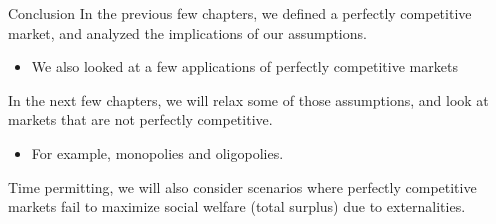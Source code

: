 \documentclass{beamer}
\begin{document}
\begin{frame}{Conclusion}
  In the previous few chapters, we defined a perfectly competitive market, and analyzed the implications of our assumptions.

  \begin{itemize}
    \item We also looked at a few applications of perfectly competitive markets
  \end{itemize}

  \medskip
  In the next few chapters, we will relax some of those assumptions, and look at markets that are not perfectly competitive.

  \begin{itemize}
    \item For example, monopolies and oligopolies.
  \end{itemize}
  
  \medskip
  Time permitting, we will also consider scenarios where perfectly competitive markets fail to maximize social welfare (total surplus) due to externalities.
\end{frame}
\end{document}
